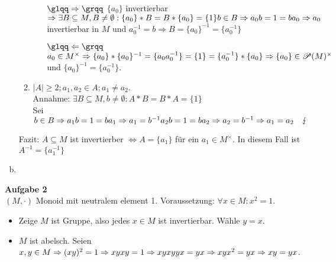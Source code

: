 \documentclass{article}
\begin{document}
\begin{enumerate}[a)]
\begin{enumerate}[1.{Fall}]
\begin{itemize}
\item[$\glqq\Rightarrow\grqq$ ]$\{a_0\}$ invertierbar $\Rightarrow\exists B\subseteq M, B\neq\emptyset : \{a_0\}*B = B*\{a_0\} = \{1\}\\
b\in B \Rightarrow a_0b = 1 = ba_0\Rightarrow a_0$ invertierbar in $M$ und $a_0^{-1} = b \Rightarrow B = \{a_0\}^{-1} = \{a_0^{-1}\}$
\item[$\glqq\Leftarrow\grqq$ ] $a_0 \in M^\times\\
\Rightarrow\{a_0\}*\{a_0\}^{-1} = \{a_0a_0^{-1}\} = \{1\} = \{a_0^{-1}\}*\{a_0\}\\
\Rightarrow \{a_0\} \in\mathscr{P}(M)^\times$ und $\{a_0\}^{-1} = \{a_0^{-1}\}$.
\end{itemize}
\item $|A| \geq 2; a_1,a_2\in A; a_1\neq a_2$.\\
Annahme: $\exists B\subseteq M, b\neq\emptyset : A*B = B*A = \{1\}$\\
Sei $b\in B \Rightarrow a_1b = 1 = ba_1 \Rightarrow a_1 = b^{-1}\\
a_2b = 1 = ba_2 \Rightarrow a_2 = b^{-1} \Rightarrow a_1 = a_2\quad\lightning$\\
\end{enumerate}
Fazit: $A\subseteq M$ ist invertierber $\Leftrightarrow A = \{a_1\}$ für ein $a_1\in M^\times$. In diesem Fall ist $A^{-1} = \{a_1^{-1}\}$
\item
\end{enumerate}

\textbf{Aufgabe 2}\\
$(M,\cdot )$ Monoid mit neutralem element 1. Voraussetzung: $\forall x\in M: x^2 = 1$.\\
\begin{itemize}
\item Zeige $M$ ist Gruppe, also jedes $x\in M$ ist invertierbar. Wähle $y=x$.
\item $M$ ist abelsch. Seien $x,y\in M \Rightarrow (xy)^2 = 1 \Rightarrow xyxy = 1 \Rightarrow xyxyyx = yx \Rightarrow xyx^2 = yx \\
\Rightarrow xy = yx$.\\
\end{itemize}
\end{document}
